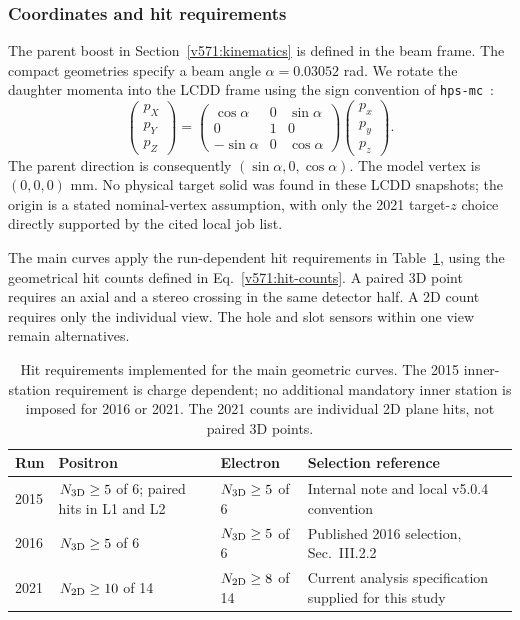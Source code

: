 \subsubsection{Coordinates and hit requirements}
The parent boost in Section~\ref{v571:kinematics} is defined in the beam frame.
The compact geometries specify a beam angle $\alpha=0.03052$ rad. We rotate
the daughter momenta into the LCDD frame using the sign convention of
\texttt{hps-mc}~\cite{v571:beam-coords}:
\begin{equation}
 \begin{pmatrix}p_X\\p_Y\\p_Z\end{pmatrix}
 =\begin{pmatrix}\cos\alpha&0&\sin\alpha\\0&1&0\\-\sin\alpha&0&\cos\alpha\end{pmatrix}
 \begin{pmatrix}p_x\\p_y\\p_z\end{pmatrix}.
 \label{v571:beam-rotation}
\end{equation}
The parent direction is consequently $(\sin\alpha,0,\cos\alpha)$.
The model vertex is $(0,0,0)$ mm. No physical target solid was found in these
LCDD snapshots; the origin is a stated nominal-vertex assumption, with only
the 2021 target-$z$ choice directly supported by the cited local job list.

The main curves apply the run-dependent hit requirements in
Table~\ref{v571:hit-selection}, using the geometrical hit counts defined in
Eq.~\eqref{v571:hit-counts}. A paired 3D point requires an axial and a stereo
crossing in the same detector half. A 2D count requires only the individual
view. The hole and slot sensors within one view remain alternatives.

\begin{table}[H]
\centering\small
\begin{tabular}{@{}l>{\raggedright\arraybackslash}p{3.0cm}>{\raggedright\arraybackslash}p{3.0cm}>{\raggedright\arraybackslash}p{4.0cm}@{}}
\toprule
Run & Positron & Electron & Selection reference\\
\midrule
2015 & $N_{\rm 3D}\geq5$ of 6; paired hits in L1 and L2
     & $N_{\rm 3D}\geq5$ of 6
     & Internal note and local v5.0.4 convention~\cite{v571:internal2015,v571:note504}\\[3pt]
2016 & $N_{\rm 3D}\geq5$ of 6
     & $N_{\rm 3D}\geq5$ of 6
     & Published 2016 selection, Sec.~III.2.2~\cite{v571:HPS2016}\\[3pt]
2021 & $N_{\rm 2D}\geq10$ of 14
     & $N_{\rm 2D}\geq8$ of 14
     & Current analysis specification supplied for this study\\
\bottomrule
\end{tabular}
\caption{Hit requirements implemented for the main geometric curves.
The 2015 inner-station requirement is charge dependent; no additional
mandatory inner station is imposed for 2016 or 2021. The 2021 counts are
individual 2D plane hits, not paired 3D points.}
\label{v571:hit-selection}
\end{table}

